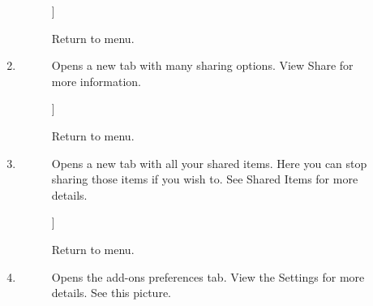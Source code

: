 \documentclass{article}
\begin{document}
\begin{description}
\begin{enumerate}
\begin{description}
											]
												 
												Return to menu.
											
										\end{description}
									
									\item 
										\begin{description}
											\item[\textbf{\emph{\paragraph*{Share}}}
												]
												\par Opens a new tab with many sharing options. View 
												Share
												for more information.
												
												]
													 
													Return to menu.
												
										\end{description}
									
									\item 
										\begin{description}
											\item[\textbf{\emph{\paragraph*{My Shared Items}}}
											]
												\par Opens a new tab with all your shared items. Here you can stop sharing those items if you
												wish to. See Shared Items for more details.
											
											]
												 
												Return to menu.
											
										\end{description}
									
									\item 
										\begin{description}
											\item[\textbf{\emph{\paragraph*{Settings}}}
											]
												\par Opens the add-ons preferences tab. View the 
												Settings for more details. See this picture.
												

\end{description}
\end{enumerate}
\end{description}
\end{document}
